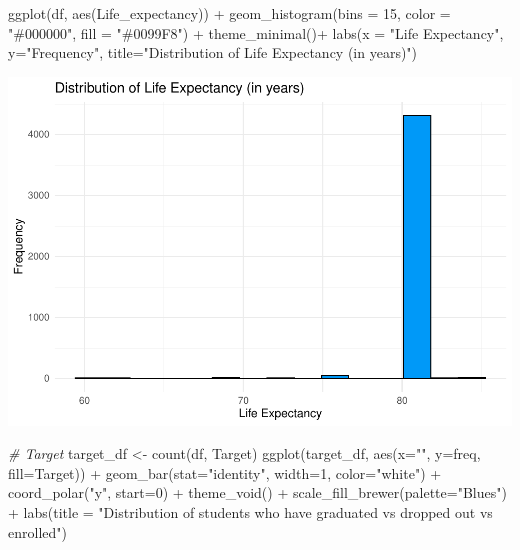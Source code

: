 \documentclass[
]{article}
\newenvironment{Shaded}{\begin{snugshade}}{\end{snugshade}}
\newcommand{\AttributeTok}[1]{\textcolor[rgb]{0.77,0.63,0.00}{#1}}
\newcommand{\CommentTok}[1]{\textcolor[rgb]{0.56,0.35,0.01}{\textit{#1}}}
\newcommand{\DecValTok}[1]{\textcolor[rgb]{0.00,0.00,0.81}{#1}}
\newcommand{\FunctionTok}[1]{\textcolor[rgb]{0.00,0.00,0.00}{#1}}
\newcommand{\NormalTok}[1]{#1}
\newcommand{\OtherTok}[1]{\textcolor[rgb]{0.56,0.35,0.01}{#1}}
\newcommand{\SpecialCharTok}[1]{\textcolor[rgb]{0.00,0.00,0.00}{#1}}
\newcommand{\StringTok}[1]{\textcolor[rgb]{0.31,0.60,0.02}{#1}}
\begin{document}
\begin{Shaded}
\begin{Highlighting}[]
\FunctionTok{ggplot}\NormalTok{(df, }\FunctionTok{aes}\NormalTok{(Life\_expectancy)) }\SpecialCharTok{+}
  \FunctionTok{geom\_histogram}\NormalTok{(}\AttributeTok{bins =} \DecValTok{15}\NormalTok{, }\AttributeTok{color =} \StringTok{"\#000000"}\NormalTok{, }\AttributeTok{fill =} \StringTok{"\#0099F8"}\NormalTok{) }\SpecialCharTok{+} \FunctionTok{theme\_minimal}\NormalTok{()}\SpecialCharTok{+}
  \FunctionTok{labs}\NormalTok{(}\AttributeTok{x =} \StringTok{"Life Expectancy"}\NormalTok{, }\AttributeTok{y=}\StringTok{"Frequency"}\NormalTok{, }\AttributeTok{title=}\StringTok{"Distribution of Life Expectancy (in years)"}\NormalTok{)}
\end{Highlighting}
\end{Shaded}

\includegraphics{midterm_files/figure-latex/unnamed-chunk-14-1.pdf}

\begin{Shaded}
\begin{Highlighting}[]
\CommentTok{\# Target}
\NormalTok{target\_df }\OtherTok{\textless{}{-}} \FunctionTok{count}\NormalTok{(df, }\StringTok{\textquotesingle{}Target\textquotesingle{}}\NormalTok{)}
\FunctionTok{ggplot}\NormalTok{(target\_df, }\FunctionTok{aes}\NormalTok{(}\AttributeTok{x=}\StringTok{""}\NormalTok{, }\AttributeTok{y=}\NormalTok{freq, }\AttributeTok{fill=}\NormalTok{Target)) }\SpecialCharTok{+}
  \FunctionTok{geom\_bar}\NormalTok{(}\AttributeTok{stat=}\StringTok{"identity"}\NormalTok{, }\AttributeTok{width=}\DecValTok{1}\NormalTok{, }\AttributeTok{color=}\StringTok{"white"}\NormalTok{) }\SpecialCharTok{+}
  \FunctionTok{coord\_polar}\NormalTok{(}\StringTok{"y"}\NormalTok{, }\AttributeTok{start=}\DecValTok{0}\NormalTok{) }\SpecialCharTok{+}
  \FunctionTok{theme\_void}\NormalTok{() }\SpecialCharTok{+} 
  \FunctionTok{scale\_fill\_brewer}\NormalTok{(}\AttributeTok{palette=}\StringTok{"Blues"}\NormalTok{) }\SpecialCharTok{+} 
  \FunctionTok{labs}\NormalTok{(}\AttributeTok{title =} \StringTok{"Distribution of students who have graduated vs dropped out vs enrolled"}\NormalTok{)}
\end{Highlighting}
\end{Shaded}
\end{document}
